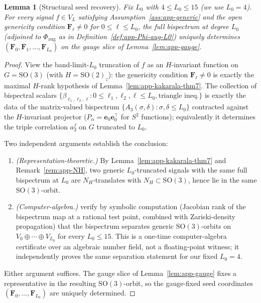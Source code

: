 \documentclass{article}
\newtheorem{lemma}[theorem]{Lemma}
\theoremstyle{definition}
\theoremstyle{remark}
\newcommand{\SO}{\mathrm{SO}}
\theoremstyle{definition}
\begin{document}
\begin{lemma}[Structural seed recovery]
\label{lem:app-seed-kakarala}
Fix $L_0$ with $4 \le L_0 \le 15$ (we use $L_0 = 4$).
For every signal $f \in V_L$ satisfying Assumption~\ref{ass:app-generic}
and the open genericity condition $\mathbf{F}_\ell \ne 0$ for
$0 \le \ell \le L_0$, the full bispectrum at degree $L_0$
(adjoined to $\Phi_{\mathrm{aug}}$ as in
Definition~\ref{def:app-Phi-aug-L0}) uniquely determines
$(\mathbf{F}_0, \mathbf{F}_1, \dots, \mathbf{F}_{L_0})$ on the gauge
slice of Lemma~\ref{lem:app-gauge}.
\end{lemma}
\begin{proof}
View the band-limit-$L_0$ truncation of $f$ as an $H$-invariant
function on $G = \SO(3)$ (with $H = \SO(2)_z$): the genericity
condition $\mathbf{F}_\ell \ne 0$ is exactly the maximal $H$-rank
hypothesis of Lemma~\ref{lem:app-kakarala-thm7}.
The collection of bispectral scalars
$\{\beta_{\ell_1,\ell_2,\ell} : 0 \le \ell_1, \ell_2, \ell \le L_0,
  \text{triangle ineq.}\}$
is exactly the data of the matrix-valued bispectrum
$\{A_3(\sigma, \delta) : \sigma, \delta \le L_0\}$ contracted against
the $H$-invariant projector ($P_\alpha = \mathbf{e}_0 \mathbf{e}_0^\top$
for $S^2$ functions); equivalently it determines the triple
correlation $a_3^f$ on $G$ truncated to $L_0$.

Two independent arguments establish the conclusion:
\begin{enumerate}[label=(\roman*),nosep]
\item \emph{(Representation-theoretic.)}
  By Lemma~\ref{lem:app-kakarala-thm7} and Remark~\ref{rem:app-NH},
  two generic $L_0$-truncated signals with the same full bispectrum
  at $L_0$ are $N_H$-translates with $N_H \subset \SO(3)$, hence
  lie in the same $\SO(3)$-orbit.
\item \emph{(Computer-algebra.)}
  \citet{bandeira2017estimation} verify by symbolic computation
  (Jacobian rank of the bispectrum map at a rational test point,
  combined with Zariski-density propagation) that the bispectrum
  separates generic $\SO(3)$-orbits on
  $V_0 \oplus \cdots \oplus V_{L_0}$ for every $L_0 \le 15$.
  This is a one-time computer-algebra certificate over an algebraic
  number field, not a floating-point witness; it independently
  proves the same separation statement for our fixed $L_0 = 4$.
\end{enumerate}
Either argument suffices.  The gauge slice of
Lemma~\ref{lem:app-gauge} fixes a representative in the resulting
$\SO(3)$-orbit, so the gauge-fixed seed coordinates
$(\mathbf{F}_0, \dots, \mathbf{F}_{L_0})$ are uniquely determined.
\end{proof}
\end{document}
